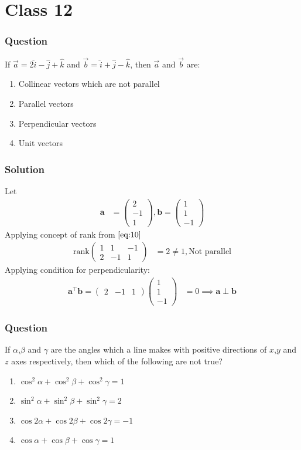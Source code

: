 \documentclass{beamer}
\theoremstyle{remark}
\newcommand{\myvec}[1]{\ensuremath{\begin{pmatrix}#1\end{pmatrix}}}
\let\vec\mathbf
\begin{document}
\section{Class 12}
%
\begin{frame}
\frametitle{Question }
If $\overrightarrow{a} = 2\hat{i} - \hat{j} + \hat{k}$ and  $\overrightarrow{b} = \hat{i} + \hat{j} - \hat{k}$, then $\overrightarrow{a}$ and $\overrightarrow{b}$ are:
    \begin{enumerate}
\item  Collinear vectors which are not parallel
\item  Parallel vectors
\item  Perpendicular vectors
\item  Unit vectors
\end{enumerate}
\end{frame}
%
\begin{frame}
\frametitle{Solution}
Let
\begin{align}
    \vec{a} &= \myvec{
        2\\
        -1\\
        1
    } , 
    \vec{b}=\myvec{
        1\\
        1\\
        -1
    }
    \end{align}
    Applying concept of rank from $\eqref{eq:10}$
    \begin{align}
                  \text{rank}\myvec{
        1 & 1 & -1\\
        2 & -1 & 1
    } &=2 \neq 1 ,
    \text{Not parallel}
    \end{align}
    Applying condition for perpendicularity:
    \begin{align}
            \vec{a}^{\top}\vec{b} = \myvec{
        2 &-1 &1
    }\myvec{
        1\\
        1\\
        -1
    } &= 0
    \implies \vec{a} \perp \vec{b}
\end{align}
\end{frame}
%
\begin{frame}
\frametitle{Question }
If $\alpha$,$\beta$ and $\gamma$ are the angles which a line makes with positive directions of $x$,$y$ and $z$ axes respectively, then which of the following are {not} true?
    \begin{enumerate}
\item  $\cos^2{\alpha} + \cos^2{\beta} + \cos^2{\gamma} = 1$
\item  $\sin^2{\alpha} + \sin^2{\beta} + \sin^2{\gamma} = 2$
\item  $\cos{2\alpha} + \cos{2\beta} + \cos{2\gamma} =-1$
\item  $\cos{\alpha} + \cos{\beta} + \cos{\gamma} = 1$
\end{enumerate}
\end{frame}
\end{document}
